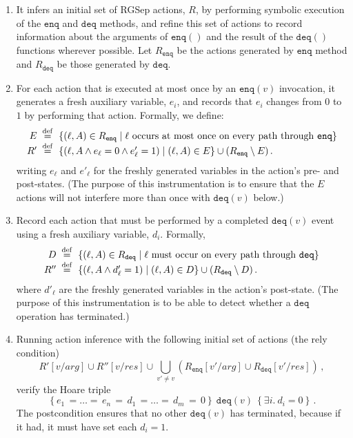 \documentclass{LMCS}
\newcommand{\defeq}{\;\stackrel{\rm def}{=}\;}
\newcommand{\enq}{\ensuremath{\mathtt{enq}}}
\newcommand{\deq}{\ensuremath{\mathtt{deq}}}
\begin{document}
\begin{enumerate}
\item It infers an initial set of RGSep actions, $R$, by performing symbolic
execution of the {\enq} and {\deq} methods, and refine this set of actions
to record information about the arguments of $\enq()$ and the result of the
$\deq()$ functions wherever possible.
Let $R_\enq$ be the actions generated by $\enq$ method and $R_\deq$ be those
generated by $\deq$.

\item For each action that is executed at most once by an $\enq(v)$ invocation,
it generates a fresh auxiliary variable, $e_i$, and records that $e_i$ changes
from $0$ to $1$ by performing that action.
Formally, we define:
\[\begin{array}{r@{~}l}
E  \defeq & \{ (\ell, A) \in R_{\enq} \mid \ell \text{ occurs at most once on every path through $\enq$} \} \\
R' \defeq & \{ (\ell, A \land e_{\ell} = 0 \land e'_{\ell} = 1) \mid (\ell, A) \in E \}
\cup (R_{\enq} \setminus E) \,.
\end{array}\]
writing $e_{\ell}$ and $e'_{\ell}$ for the freshly generated variables in the
action's pre- and post-states.
(The purpose of this instrumentation is to ensure that the $E$ actions will 
not interfere more than once with $\deq(v)$ below.)

\item Record each action that must be performed by a completed $\deq(v)$ event
using a fresh auxiliary variable, $d_i$.  Formally,
\[\begin{array}{r@{~}l}
D   \defeq & \{(\ell,A) \in R_\deq  \mid \ell \text{ must occur on every path through $\deq$} \} \\
R'' \defeq & \{(\ell,A \wedge d'_{\ell} = 1) \mid (\ell, A)\in D\} \cup (R_{\deq} \setminus D) \,. 
\end{array}\]
where $d'_{\ell}$ are the freshly generated variables in the action's
post-state.
(The purpose of this instrumentation is to be able to detect whether a
$\deq$ operation has terminated.) 

\item 
Running action inference with the following initial set of actions (the rely condition)
\[
  R'[v/\mathit{arg}] \cup R''[v/\mathit{res}] \cup 
\bigcup_{v'\neq v} (R_{\enq}[v'/\mathit{arg}] \cup R_{\deq}[v'/\mathit{res}]) 
\,,
\]
verify the Hoare triple
\[
   \left\{ e_1 \,{=} \ldots{=}\, e_n \,{=}\, d_1 \,{=}\ldots {=}\, d_m \,{=}\, 0 \right\}\ \deq(v)\
   \left\{ \exists i.~ d_i = 0 \right\}
\,.
\]
The postcondition ensures that no other $\deq(v)$ has terminated, because if it
had, it must have set each $d_i = 1$.
\end{enumerate}
\end{document}
